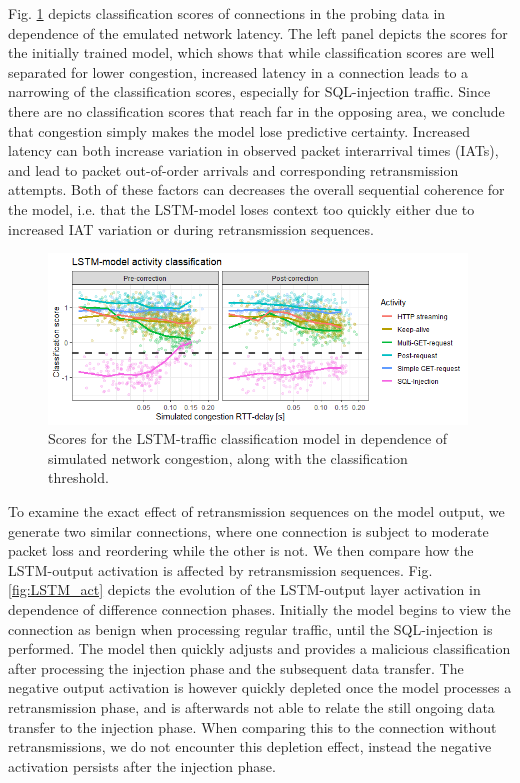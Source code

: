 \documentclass[runningheads]{llncs}
\begin{document}
Fig. \ref{fig:LSTM_exp} depicts classification scores of connections in the probing data in dependence of the emulated network latency. The left panel depicts the scores for the initially trained model, which shows that while classification scores are well separated for lower congestion, increased latency in a connection leads to a narrowing of the classification scores, especially for SQL-injection traffic. Since there are no classification scores that reach far in the opposing area, we conclude that congestion simply makes the model lose predictive certainty. 
Increased latency can both increase variation in observed packet interarrival times (IATs), and lead to packet out-of-order arrivals and corresponding retransmission attempts. Both of these factors can decreases the overall sequential coherence for the model, i.e. that the LSTM-model loses context too quickly either due to increased IAT variation or during retransmission sequences. 


\begin{figure}
\centering
\includegraphics[width=0.99\textwidth]{images/LSTM_classi.png}
\caption{Scores for the LSTM-traffic classification model in dependence of simulated network congestion, along with the classification threshold. }\label{fig:LSTM_exp}
\end{figure}

To examine the exact effect of retransmission sequences on the model output, we generate two similar connections, where one connection is subject to moderate packet loss and reordering while the other is not. We then compare how the LSTM-output activation is affected by retransmission sequences. Fig. \ref{fig:LSTM_act} depicts the evolution of the LSTM-output layer activation in dependence of difference connection phases. Initially the model begins to view the connection as benign when processing regular traffic, until the SQL-injection is performed. The model then quickly adjusts and provides a malicious classification after processing the injection phase and the subsequent data transfer. The negative output activation is however quickly depleted once the model processes a retransmission phase, and is afterwards not able to relate the still ongoing data transfer to the injection phase. When comparing this to the connection without retransmissions, we do not encounter this depletion effect, instead the negative activation persists after the injection phase.
\end{document}
